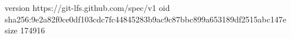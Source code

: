 version https://git-lfs.github.com/spec/v1
oid sha256:9e2a82f0ce0df103cdc7fc44845283b9ac9c87bbc899a653189df2515abc147e
size 174916
